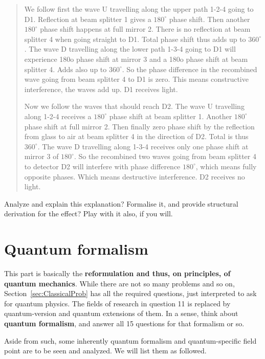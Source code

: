 \documentclass[10pt]{article}
\begin{document}
\begin{quote}
  We follow first the wave U travelling along the upper path 1-2-4 going to D1. Reflection at beam splitter 1 gives a $180^{\circ}$ phase shift. Then another $180^{\circ}$ phase shift happens at full mirror 2. There is no reflection at beam splitter 4 when going straight to D1. Total phase shift thus adds up to $360^{\circ}$. The wave D travelling along the lower path 1-3-4 going to D1 will experience 180o phase shift at mirror 3 and a 180o phase shift at beam splitter 4. Adds also up to $360^{\circ}$. So the phase difference in the recombined wave going from beam splitter 4 to D1 is zero. This means constructive interference, the waves add up. D1 receives light.

  Now we follow the waves that should reach D2. The wave U travelling along 1-2-4 receives a $180^{\circ}$ phase shift at beam splitter 1. Another $180^{\circ}$ phase shift at full mirror 2. Then finally zero phase shift by the reflection from glass to air at beam splitter 4 in the direction of D2. Total is thus $360^{\circ}$. The wave D travelling along 1-3-4 receives only one phase shift at mirror 3 of $180^{\circ}$. So the recombined two waves going from beam splitter 4 to detector D2 will interfere with phase difference $180^{\circ}$, which means fully opposite phases. Which means destructive interference. D2 receives no light.
\end{quote}

Analyze and explain this explanation? Formalise it, and provide structural derivation for the effect? Play with it also, if you will. 

\section{Quantum formalism}

This part is basically the \textbf{reformulation and thus, on principles, of quantum mechanics}. While there are not so many problems and so on, Section~\ref{sec:ClassicalProb} has all the required questions, just interpreted to ask for quantum physics. The fields of research in question 11 is replaced by quantum-version and quantum extensions of them. In a sense, think about \textbf{quantum formalism}, and answer all 15 questions for that formalism or so. 

Aside from such, some inherently quantum formalism and quantum-specific field point are to be seen and analyzed. We will list them as followed. 
\end{document}
